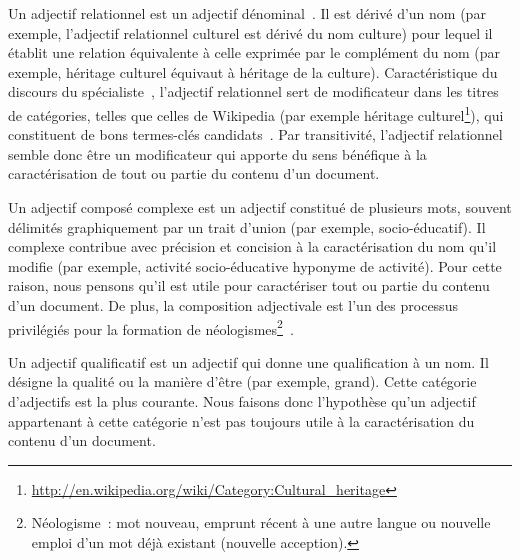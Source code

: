       Un adjectif relationnel est un adjectif
      dénominal~\cite{bally1944linguistiquegeneraleetlinguistiquefrancaise}. Il
      est dérivé d'un nom (par exemple, l'adjectif relationnel
      \og{}culturel\fg{} est dérivé du nom \og{}culture\fg{}) pour lequel il
      établit une relation équivalente à celle exprimée par le complément du nom
      (par exemple, \og{}héritage culturel\fg{} équivaut à \og{}héritage de la
      culture\fg{}). Caractéristique du discours du
      spécialiste~\cite{maniez2009denominaladjectives}, l'adjectif relationnel
      sert de modificateur dans les titres de catégories, telles que celles de
      Wikipedia (par exemple \og{}héritage
      culturel\fg{}\footnote{\url{http://en.wikipedia.org/wiki/Category:Cultural_heritage}}),
      qui constituent de bons termes-clés
      candidats~\cite{medelyan2008smalltrainingset,eichler2010keywe}. Par
      transitivité, l'adjectif relationnel semble donc être un modificateur qui
      apporte du sens bénéfique à la caractérisation  de tout ou partie du
      contenu d'un document.
      
      Un adjectif composé complexe est un adjectif constitué de plusieurs mots,
      souvent délimités graphiquement par un trait d'union (par exemple,
      \og{}socio-éducatif\fg{}). Il complexe contribue avec
      précision et concision à la caractérisation du nom qu'il modifie (par
      exemple, \og{}activité socio-éducative\fg{} hyponyme de
      \og{}activité\fg{}). Pour cette raison, nous pensons qu'il est utile pour
      caractériser tout ou partie du contenu d'un document. De plus, la
      composition adjectivale est l'un des processus privilégiés pour la
      formation de néologismes\footnote{Néologisme~: mot nouveau, emprunt récent
      à une autre langue ou nouvelle emploi d'un mot déjà existant (nouvelle
      acception).}~\cite{boughedaoui1997adjectifscomposes}.

      Un adjectif qualificatif est un adjectif qui donne une qualification à un
      nom. Il désigne la qualité ou la manière d'être (par exemple,
      \og{}grand\fg{}). Cette catégorie d'adjectifs est la plus
      courante. Nous faisons donc l'hypothèse qu'un adjectif appartenant à
      cette catégorie n'est pas toujours utile à la caractérisation du contenu
      d'un document.
      
